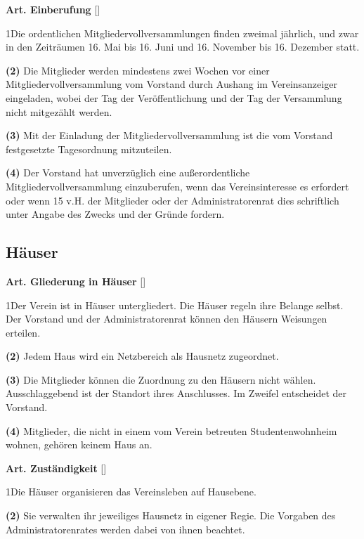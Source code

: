 \documentclass[12pt]{article}
\newcommand{\UAbschnitt}[1]{\subsection{#1}}
\newcommand{\Satz}[2]{

\begin{samepage}
{\bf (#1)} #2
\end{samepage}
}
\newenvironment{Artikel}[2]{
\bigskip \centerline{{\bf Art. #1} [#2]}
\nopagebreak
}{
}
\begin{document}
\begin{Artikel}{16}{Einberufung}

\Satz{1}{Die ordentlichen Mitgliedervollversammlungen finden zweimal jährlich, und zwar in den Zeiträumen 16. Mai bis 16. Juni und 16. November bis 16. Dezember statt.}

\Satz{2}{Die Mitglieder werden mindestens zwei Wochen vor einer Mitgliedervollversammlung vom Vorstand durch Aushang im Vereinsanzeiger eingeladen, wobei der Tag der Ver\-öffent\-lichung und der Tag der Versammlung nicht mitgezählt werden.}

\Satz{3}{Mit der Einladung der Mitgliedervollversammlung ist die vom Vorstand festgesetzte Tagesordnung mitzuteilen.}

\Satz{4}{Der Vorstand hat unverzüglich  eine außerordentliche Mitgliedervollversammlung einzuberufen, wenn das Vereinsinteresse es erfordert oder wenn 15 v.H. der Mitglieder oder der Administratorenrat dies schriftlich unter Angabe des Zwecks und der Gründe fordern.}

\end{Artikel}

\UAbschnitt{Häuser}

\begin{Artikel}{17}{Gliederung in Häuser}

\Satz{1}{Der Verein ist in Häuser untergliedert.
  Die Häuser regeln ihre Belange selbst.
  Der Vorstand und der Administratorenrat können den Häusern Weisungen erteilen.}

\Satz{2}{Jedem Haus wird ein Netzbereich als Hausnetz zugeordnet.}

\Satz{3}{Die Mitglieder können die Zuordnung zu den Häusern nicht wählen.
  Ausschlaggebend ist der Standort ihres Anschlusses.
  Im Zweifel entscheidet der Vorstand.}

\Satz{4}{Mitglieder, die nicht in einem vom Verein betreuten Studentenwohnheim wohnen, gehören keinem Haus an.}

\end{Artikel}

\begin{Artikel}{18}{Zuständigkeit}

\Satz{1}{Die Häuser organisieren das Vereinsleben auf Hausebene.}

\Satz{2}{Sie verwalten ihr jeweiliges Hausnetz in eigener Regie.
  Die Vorgaben des Administratorenrates werden dabei von ihnen beachtet.}

\end{Artikel}
\end{document}
